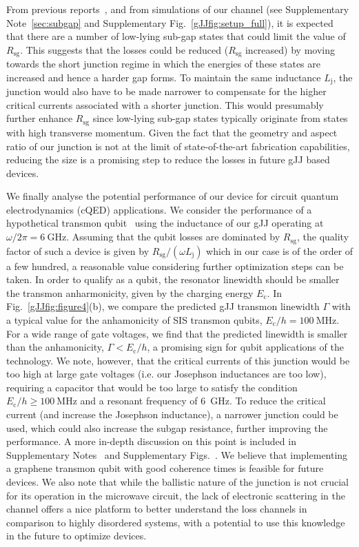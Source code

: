 From previous reports~\cite{rosdahlAndreevRectifierNonlocal2018}, and from simulations of our channel (see Supplementary Note~\ref{sec:subgap} and Supplementary Fig.~\ref{gJJfig:setup_full}), it is expected that there are a number of low-lying sub-gap states that could limit the value of $R_\text{sg}$.
This suggests that the losses could be reduced ($R_\text{sg}$ increased) by moving towards the short junction regime in which the energies of these states are increased and hence a harder gap forms.
To maintain the same inductance $L_\text{j}$, the junction would also have to be made narrower to compensate for the higher critical currents associated with a shorter junction.
This would presumably further enhance $R_\text{sg}$ since low-lying sub-gap states typically originate from states with high transverse momentum.
Given the fact that the geometry and aspect ratio of our junction is not at the limit of state-of-the-art fabrication capabilities, reducing the size is a promising step to reduce the losses in future gJJ based devices.

We finally analyse the potential performance of our device for circuit quantum electrodynamics (cQED) applications.
We consider the performance of a hypothetical transmon qubit~\cite{kochChargeinsensitiveQubitDesign2007b} using the inductance of our gJJ operating at $\omega/2\pi=\SI{6}{\giga\hertz}$.
Assuming that the qubit losses are dominated by $R_\text{sg}$, the quality factor of such a device is given by $R_\text{sg}/(\omega L_\text{j})$ which in our case is of the order of a few hundred, a reasonable value considering further optimization steps can be taken.
In order to qualify as a qubit, the resonator linewidth should be smaller the transmon anharmonicity, given by the charging energy $E_\text{c}$.
In Fig.~\ref{gJJfig:figure4}(b), we compare the predicted gJJ transmon linewidth $\Gamma$ with a typical value for the anhamonicity of SIS transmon qubits, $E_\text{c}/h = \SI{100}{\mega\hertz}$.
For a wide range of gate voltages, we find that the predicted linewidth is smaller than the anhamonicity, $\Gamma < E_\text{c}/h$, a promising sign for qubit applications of the technology.
We note, however, that the critical currents of this junction would be too high at large gate voltages (i.e. our Josephson inductances are too low), requiring a capacitor that would be too large to satisfy the condition $E_\text{c}/h \geq \SI{100}{\mega\hertz}$ and a resonant frequency of \SI{6}{\giga\hertz}.
To reduce the critical current (and increase the Josephson inductance), a narrower junction could be used, which could also increase the subgap resistance, further improving the performance.
A more in-depth discussion on this point is included in Supplementary Notes~ and Supplementary Figs.~.
We believe that implementing a graphene transmon qubit with good coherence times is feasible for future devices.
We also note that while the ballistic nature of the junction is not crucial for its operation in the microwave circuit, the lack of electronic scattering in the channel offers a nice platform to better understand the loss channels in comparison to highly disordered systems, with a potential to use this knowledge in the future to optimize devices. 

